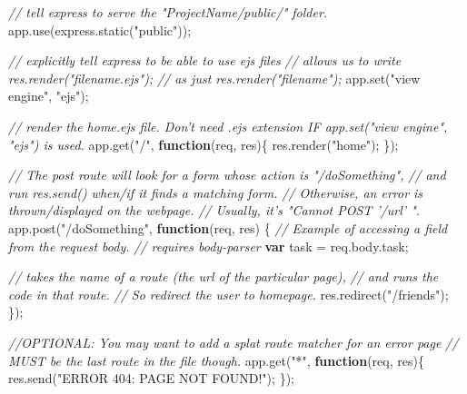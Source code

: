 \documentclass[11pt]{article}
\newenvironment{Shaded}{}{}
\newcommand{\KeywordTok}[1]{\textcolor[rgb]{0.00,0.44,0.13}{\textbf{{#1}}}}
\newcommand{\StringTok}[1]{\textcolor[rgb]{0.25,0.44,0.63}{{#1}}}
\newcommand{\CommentTok}[1]{\textcolor[rgb]{0.38,0.63,0.69}{\textit{{#1}}}}
\newcommand{\NormalTok}[1]{{#1}}
\newcommand{\VariableTok}[1]{\textcolor[rgb]{0.10,0.09,0.49}{{#1}}}
\newcommand{\OperatorTok}[1]{\textcolor[rgb]{0.40,0.40,0.40}{{#1}}}
\newcommand{\AttributeTok}[1]{\textcolor[rgb]{0.49,0.56,0.16}{{#1}}}
\begin{document}
\begin{enumerate}
\begin{Shaded}
\begin{Highlighting}[]
 \CommentTok{// tell express to serve the "ProjectName/public/" folder.}
 \VariableTok{app}\NormalTok{.}\AttributeTok{use}\NormalTok{(}\VariableTok{express}\NormalTok{.}\AttributeTok{static}\NormalTok{(}\StringTok{"public"}\NormalTok{))}\OperatorTok{;}

 \CommentTok{// explicitly tell express to be able to use ejs files}
 \CommentTok{// allows us to write res.render("filename.ejs");}
 \CommentTok{//  as just res.render("filename");}
 \VariableTok{app}\NormalTok{.}\AttributeTok{set}\NormalTok{(}\StringTok{"view engine"}\OperatorTok{,} \StringTok{"ejs"}\NormalTok{)}\OperatorTok{;}

 \CommentTok{// render the home.ejs file. Don't need .ejs extension IF app.set("view engine", "ejs") is used.}
 \VariableTok{app}\NormalTok{.}\AttributeTok{get}\NormalTok{(}\StringTok{"/"}\OperatorTok{,} \KeywordTok{function}\NormalTok{(req}\OperatorTok{,}\NormalTok{ res)}\OperatorTok{\{}
 \VariableTok{res}\NormalTok{.}\AttributeTok{render}\NormalTok{(}\StringTok{"home"}\NormalTok{)}\OperatorTok{;}
 \OperatorTok{\}}\NormalTok{)}\OperatorTok{;}

 \CommentTok{// The post route will look for a form whose action is "/doSomething",}
 \CommentTok{//   and run res.send() when/if it finds a matching form.}
 \CommentTok{// Otherwise, an error is thrown/displayed on the webpage.}
 \CommentTok{//   Usually, it's "Cannot POST '/url' ".}
 \VariableTok{app}\NormalTok{.}\AttributeTok{post}\NormalTok{(}\StringTok{"/doSomething"}\OperatorTok{,} \KeywordTok{function}\NormalTok{(req}\OperatorTok{,}\NormalTok{ res) }\OperatorTok{\{}
   \CommentTok{// Example of accessing a field from the request body.}
   \CommentTok{// requires body-parser}
   \KeywordTok{var}\NormalTok{ task }\OperatorTok{=} \VariableTok{req}\NormalTok{.}\VariableTok{body}\NormalTok{.}\AttributeTok{task}\OperatorTok{;}

   \CommentTok{// takes the name of a route (the url of the particular page),}
   \CommentTok{//  and runs the code in that route.}
   \CommentTok{// So redirect the user to homepage.}
   \VariableTok{res}\NormalTok{.}\AttributeTok{redirect}\NormalTok{(}\StringTok{"/friends"}\NormalTok{)}\OperatorTok{;}
 \OperatorTok{\}}\NormalTok{)}\OperatorTok{;}

 \CommentTok{//OPTIONAL: You may want to add a splat route matcher for an error page}
 \CommentTok{// MUST be the last route in the file though.}
 \VariableTok{app}\NormalTok{.}\AttributeTok{get}\NormalTok{(}\StringTok{"*"}\OperatorTok{,} \KeywordTok{function}\NormalTok{(req}\OperatorTok{,}\NormalTok{ res)}\OperatorTok{\{}
 \VariableTok{res}\NormalTok{.}\AttributeTok{send}\NormalTok{(}\StringTok{"ERROR 404: PAGE NOT FOUND!"}\NormalTok{)}\OperatorTok{;}
 \OperatorTok{\}}\NormalTok{)}\OperatorTok{;}


\end{Highlighting}
\end{Shaded}
\end{enumerate}
\end{document}
